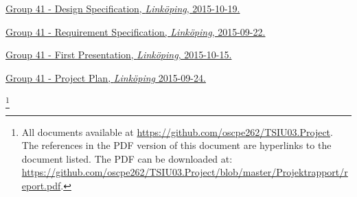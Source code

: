 




\renewcommand*{\refname}{References to the Project File}
\begin{thebibliography}{99}\label{cha:refs}

  \href{https://github.com/oscpe262/TSIU03.Project/blob/master/Designspec/designspec.pdf}{
    Group 41 - Design Specification,
    \emph{Linköping},
    2015-10-19.
  }

  \href{https://github.com/oscpe262/TSIU03.Project/blob/master/Kravspec/Kravspecifikation.pdf}{
    Group 41 - Requirement Specification,
    \emph{Linköping},
    2015-09-22.
  }
  
  \href{https://github.com/oscpe262/TSIU03.Project/blob/master/Presentationer/firstpres.pdf}{
    Group 41 - First Presentation,
    \emph{Linköping},
    2015-10-15.
  }
  
  \href{https://github.com/oscpe262/TSIU03.Project/blob/master/Projektplan/Project.plan.pdf}{
    Group 41 - Project Plan,
    \emph{Linköping}
    2015-09-24.
  }
  
  
\end{thebibliography}
\let\thefootnote\relax\footnote{All documents available at \url{https://github.com/oscpe262/TSIU03.Project}. The references in the PDF version of this document are hyperlinks to the document listed. The PDF can be downloaded at: \\\url{https://github.com/oscpe262/TSIU03.Project/blob/master/Projektrapport/report.pdf}.}

